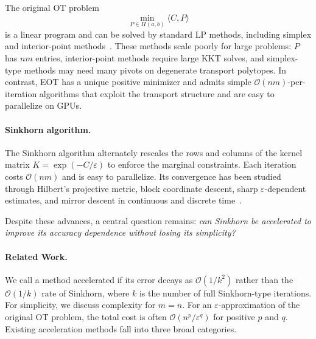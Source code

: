 \documentclass{article}
\theoremstyle{plain}
\theoremstyle{remark}
\begin{document}
The original OT problem
\begin{equation}\label{eq:OT}
\min_{P \in \Pi(a,b)} \langle C, P \rangle
\end{equation}
is a linear program and can be solved by standard LP methods, including simplex and interior-point methods~\citep{peyre2019computational}. These methods scale poorly for large problems: $P$ has $nm$ entries, interior-point methods require large KKT solves, and simplex-type methods may need many pivots on degenerate transport polytopes. In contrast, EOT has a unique positive minimizer and admits simple $\mathcal O(nm)$-per-iteration algorithms that exploit the transport structure and are easy to parallelize on GPUs.

\paragraph{Sinkhorn algorithm.}
The Sinkhorn algorithm \citep{sinkhorn1964} alternately rescales the rows and columns of the kernel matrix $K=\exp(-C/\varepsilon)$ to enforce the marginal constraints. Each iteration costs $\mathcal O(nm)$ and is easy to parallelize. Its convergence has been studied through Hilbert's projective metric, block coordinate descent, sharp $\varepsilon$-dependent estimates, and mirror descent in continuous and discrete time~\citep{franklin1989scaling,carlier2022linear,ghosal2025convergence,chizat2026sharper,pmlr-v238-reza-karimi24a,mishchenko2019sinkhorn,leger2021gradient,aubin2022mirror,pmlr-v235-chopin24a}.

Despite these advances, a central question remains: \emph{can Sinkhorn be accelerated to improve its accuracy dependence without losing its simplicity?}

\paragraph{Related Work.}
We call a method accelerated if its error decays as $\mathcal{O}(1/k^2)$ rather than the $\mathcal{O}(1/k)$ rate of Sinkhorn, where $k$ is the number of full Sinkhorn-type iterations. For simplicity, we discuss complexity for $m=n$. For an $\varepsilon$-approximation of the original OT problem, the total cost is often $\mathcal{O}(n^p/\varepsilon^q)$ for positive $p$ and $q$. Existing acceleration methods fall into three broad categories.
\end{document}
